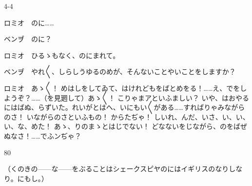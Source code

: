\documentclass[tate,paper=b6j,jafontsize=9pt]{jlreq}
\begin{document}
\begin{azconvIndented}{4\zw}{-4\zw}

ロミオ　のに……

ベンヺ　のに？

ロミオ　ひるゝもなく、のにまれて。

ベンヺ　やれ{〳〵}、しらしうゆるのめが、そんないことやいことをしますか？

ロミオ　あゝ{〳〵}！ めはしをしてゐて、はけれどもをばとめをる！……え、でをしようぞ？……（を見𢌞して）あゝ{〳〵}！ こりゃまアといふましい？ いや、はおやるにはばぬ、らずいた。れいがとはへ、いにもい{〳〵}がある……すればりゃみながらのさ！ いながらのさといふもの！ からたぢゃ！ しいれ、んだ、いさ、い、い、い、な、めた！ あゝ、りのまゝとはじでない！ どなないをじながら、のをばぜぬなさ！……でふンぢゃ？

\end{azconvIndented}
\begin{azconvIndented}{8\zw}{0\zw}

（くのきの------な------をぶることはシェークスピヤのにはイギリスのなりしなり。にもし。）

\end{azconvIndented}
\end{document}
